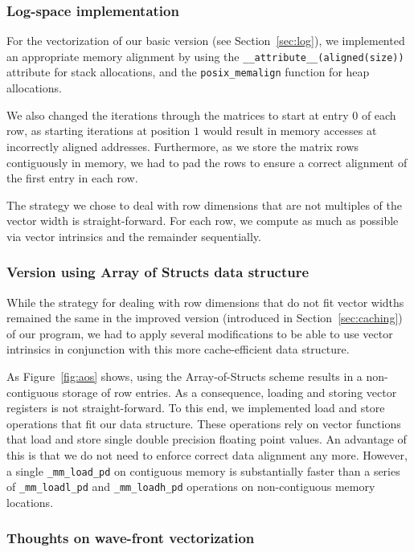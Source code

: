 \documentclass[runningheads,a4paper]{llncs}
\begin{document}
\subsubsection{Log-space implementation}
For the vectorization of our basic version (see Section~\ref{sec:log}), we implemented an appropriate memory alignment 
by using the \texttt{\_\_attribute\_\_(aligned(\texttt{size}))} attribute for stack allocations, 
and the \texttt{posix\_memalign} function for heap allocations.

We also changed the iterations through the matrices to start at entry $0$ of each row, as starting iterations at position $1$ 
would result in memory accesses at incorrectly aligned addresses. 
Furthermore, as we store the matrix rows contiguously in memory, 
we had to pad the rows to ensure a correct alignment of the first entry in each row.

The strategy we chose to deal with row dimensions that are not multiples of the vector width is straight-forward. 
For each row, we compute as much as possible via vector intrinsics and the remainder sequentially. 

\subsubsection{Version using Array of Structs data structure}
While the strategy for dealing with row dimensions that do not fit vector widths remained the same in the improved version (introduced in Section~\ref{sec:caching}) of our program, 
we had to apply several modifications to be able to use vector intrinsics in conjunction with this more cache-efficient data structure.

As Figure~\ref{fig:aos} shows, using the Array-of-Structs scheme results in a non-contiguous storage of row entries. 
As a consequence, loading and storing vector registers is not straight-forward. 
To this end, we implemented load and store operations that fit our data structure. 
These operations rely on vector functions that load and store single double precision floating point values. 
An advantage of this is that we do not need to enforce correct data alignment any more. 
However, a single  \texttt{\_mm\_load\_pd} on contiguous memory is substantially faster than a series of \texttt{\_mm\_loadl\_pd} and \texttt{\_mm\_loadh\_pd} operations
on non-contiguous memory locations.


\subsubsection{Thoughts on wave-front vectorization}
\end{document}
